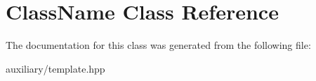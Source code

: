 \hypertarget{class_class_name}{\section{Class\-Name Class Reference}
\label{class_class_name}
}


The documentation for this class was generated from the following file\-:\begin{DoxyCompactItemize}
\item 
auxiliary/template.\-hpp\end{DoxyCompactItemize}

